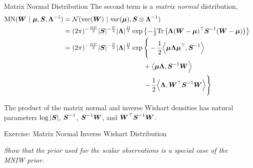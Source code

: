 \documentclass[aspectratio=169]{beamer}
\begin{document}
\begin{frame}{Matrix Normal Distribution}
The second term is a \emph{matrix normal} distribution,
\begin{align}
    \mathrm{MN}(\mbW \mid \mbmu, \mbS, \mbLambda^{-1})
    &= \cN(\mathrm{vec}(\mbW) \mid \mathrm{vec}(\mbmu), \mbS \otimes \mbLambda^{-1}) \\
    &= (2\pi)^{-\frac{DP}{2}} |\mbS |^{-\frac{P}{2}} |\mbLambda|^{\frac{D}{2}} 
    \exp \left\{ -\tfrac{1}{2} \Tr\left( \mbLambda (\mbW - \mbmu)^\top \mbS^{-1} (\mbW - \mbmu) 
    \right) \right\} \\
    \nonumber
    &= (2\pi)^{-\frac{DP}{2}} |\mbS |^{-\frac{P}{2}} |\mbLambda|^{\frac{D}{2}} 
    \exp \Bigg\{ 
    -\frac{1}{2} \Big \langle \mbmu \mbLambda \mbmu^\top, \mbS^{-1} \Big \rangle
    \\
    \nonumber
    &\hspace{12em}
    + \big \langle \mbmu \mbLambda, \mbS^{-1} \mbW \Big \rangle 
    \\
    &\hspace{12em}
    -\frac{1}{2} \Big\langle \mbLambda,  \mbW^\top \mbS^{-1} \mbW \Big \rangle
    \Bigg\}
\end{align}

The product of the matrix normal and inverse Wishart densities has natural parameters $\log |\boldsymbol{S}|$, $\boldsymbol{S}^{-1}$, $\boldsymbol{S}^{-1} \boldsymbol{W}$, and $\boldsymbol{W}^\top \boldsymbol{S}^{-1} \boldsymbol{W}$.

\end{frame}

\begin{frame}[t]{Exercise: Matrix Normal Inverse Wishart Distribution}

\textit{Show that the prior used for the scalar observations is a special case of the MNIW prior.}

\end{frame}
\end{document}
